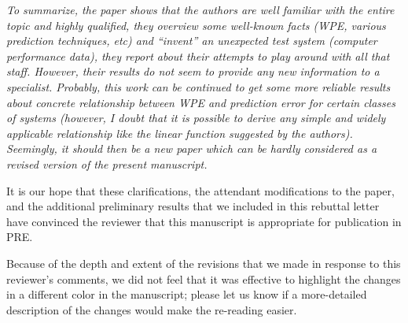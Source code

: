 \documentclass[12pt]{article}
\begin{document}
\emph{To summarize, the paper shows that the authors are well familiar
  with the entire topic and highly qualified, they overview some
  well-known facts (WPE, various prediction techniques, etc) and
  ``invent'' an unexpected test system (computer performance data),
  they report about their attempts to play around with all that
  staff. However, their results do not seem to provide any new
  information to a specialist. Probably, this work can be continued to
  get some more reliable results about concrete relationship between
  WPE and prediction error for certain classes of systems (however, I
  doubt that it is possible to derive any simple and widely applicable
  relationship like the linear function suggested by the
  authors). Seemingly, it should then be a new paper which can be
  hardly considered as a revised version of the present manuscript.}

It is our hope that these clarifications, the attendant modifications
to the paper, and the additional preliminary results that we included
in this rebuttal letter have convinced the reviewer that this
manuscript is appropriate for publication in PRE.

Because of the depth and extent of the revisions that we made in
response to this reviewer's comments, we did not feel that it was
effective to highlight the changes in a different color in the
manuscript; please let us know if a more-detailed description of the
changes would make the re-reading easier.
\end{document}

